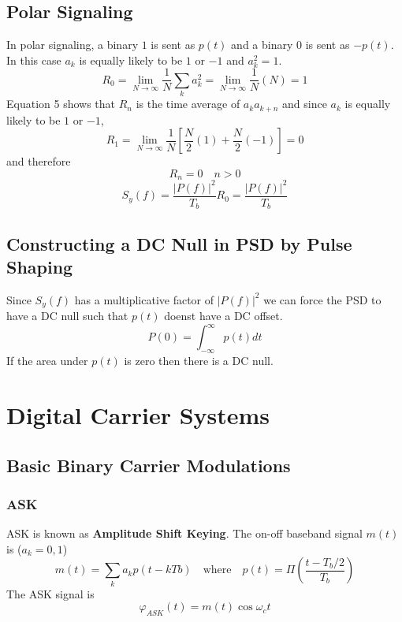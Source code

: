 \documentclass{article}
\begin{document}
    \subsection{Polar Signaling}
    In polar signaling, a binary $1$ is sent as $p(t)$ and a binary $0$ is sent as $-p(t)$. In this case
    $a_k$ is equally likely to be $1$  or $-1$ and $a_k^2 = 1$.
    \begin{equation}
        R_0 = \lim_{N\rightarrow \infty} \frac{1}{N}\sum_k a_k^2 =  \lim_{N\rightarrow \infty} \frac{1}{N}(N) = 1
    \end{equation}
    Equation 5 shows that $R_n$ is the time average of $a_ka_{k+n}$ and since $a_k$ is equally likely
    to be $1$ or $-1$,
    \begin{equation}
        R_1 = \lim_{N \rightarrow \infty} \frac{1}{N}[\frac{N}{2}(1) + \frac{N}{2}(-1)] = 0
    \end{equation}
    and therefore 
    \begin{equation}
        R_n = 0 \quad n > 0
    \end{equation}
    \begin{equation}
        S_y(f) = \frac{|P(f)|^2}{T_b}R_0 = \frac{|P(f)|^2}{T_b}
    \end{equation}

    \subsection{Constructing a DC Null in PSD by Pulse Shaping}
    Since $S_y(f)$ has a multiplicative factor of $|P(f)|^2$ we can force the PSD to have a DC null 
    such that $p(t)$ doenst have a DC offset.
    \begin{equation}
        P(0) = \int_{-\infty}^{\infty}p(t)dt
    \end{equation}
    If the area under $p(t)$ is zero then there is a DC null.

    \section{Digital Carrier Systems}
    \subsection{Basic Binary Carrier Modulations}
    \subsubsection{ASK}
    ASK is known as \textbf{Amplitude Shift Keying}. The on-off baseband signal $m(t)$ is ($a_k = 0,1$)
    \begin{equation}
        m(t) = \sum_k a_k p(t-kTb) \quad \textrm{where} \quad p(t) = \Pi (\frac{t-T_b/2}{T_b})
    \end{equation}
    The ASK signal is
    \begin{equation}
        \varphi_{ASK}(t) = m(t)\cos \omega_ct
    \end{equation}
\end{document}
